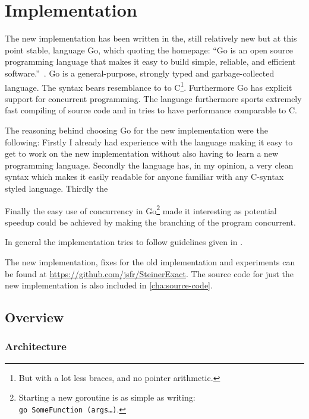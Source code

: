  {
\abnormalparskip{0pt}
\chapter{Implementation}
\label{cha:implementation}
}


The new implementation has been written in the, still relatively new but at this
point stable, language Go, which quoting the homepage: ``Go is an open source
programming language that makes it easy to build simple, reliable, and efficient
software.''~\cite{golanghomepage}. Go is a general-purpose, strongly typed and
garbage-collected language. The syntax bears resemblance to to C\footnote{But
  with a lot less braces, and no pointer arithmetic.}. Furthermore Go has
explicit support for concurrent programming. The language furthermore sports
extremely fast compiling of source code and in tries to have performance
comparable to C.

The reasoning behind choosing Go for the new implementation were the following:
Firstly I already had experience with the language making it easy to get to work
on the new implementation without also having to learn a new programming
language. Secondly the language has, in my opinion, a very clean syntax which
makes it easily readable for anyone familiar with any C-syntax styled
language. Thirdly the

Finally the easy use of concurrency in Go\footnote{Starting a new goroutine is
  as simple as writing: \texttt{go~SomeFunction~(args\ldots)}.} made it
interesting as potential speedup could be achieved by making the branching
of the program concurrent.

In general the implementation tries to follow guidelines given in
\textcite{effectivego}.

The new implementation, fixes for the old implementation and experiments can be
found at \url{https://github.com/jsfr/SteinerExact}. The source
code for just the new implementation is also included in \cref{cha:source-code}.

\section{Overview}
\label{sec:overview-1}

\subsection{Architecture}
\label{sec:architecture}

